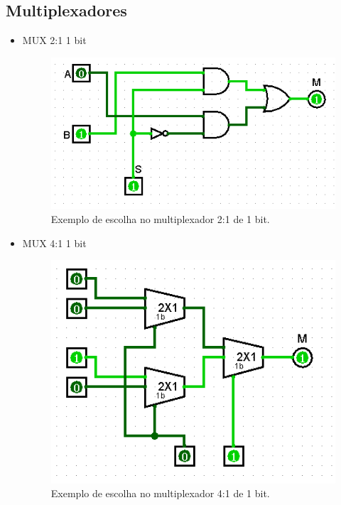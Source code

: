 \documentclass[
	12pt,				%
	openright,			%
	twoside,			%
	a4paper,			%
	english,			%
	french,				%
	spanish,			%
	brazil,				%
	]{abntex2}
\begin{document}
\begin{apendicesenv}
\newpage
\section{Multiplexadores}

\begin{itemize}
\item {MUX 2:1 1 bit}
\begin{figure}[H]
	\begin{center}
	    \includegraphics[scale=0.6]{mux211teste.png}
	\end{center}
\caption{\label{mux211teste}Exemplo de escolha no multiplexador 2:1 de 1 bit.}
\end{figure}

\item {MUX 4:1 1 bit}
\begin{figure}[H]
	\begin{center}
	    \includegraphics[scale=0.6]{mux411teste.png}
	\end{center}
\caption{\label{mux411teste}Exemplo de escolha no multiplexador 4:1 de 1 bit.}
\end{figure}


\end{itemize}
\end{apendicesenv}
\end{document}
